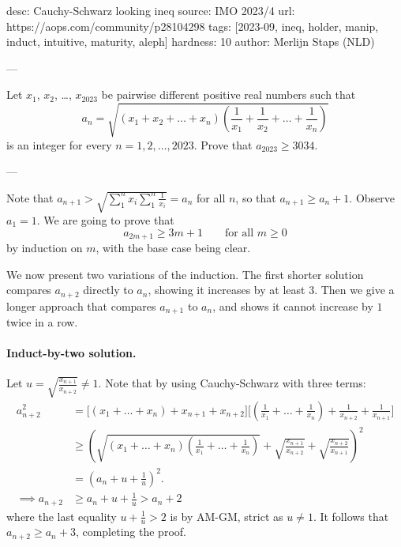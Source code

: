 desc: Cauchy-Schwarz looking ineq
source: IMO 2023/4
url: https://aops.com/community/p28104298
tags: [2023-09, ineq, holder, manip, induct, intuitive, maturity, aleph]
hardness: 10
author: Merlijn Staps (NLD)

---

Let $x_1$, $x_2$, \dots, $x_{2023}$ be pairwise different positive real numbers such that
\[ a_n = \sqrt{(x_1+x_2+\dots+x_n)
  \left(\frac{1}{x_1}+\frac{1}{x_2}+\dots+\frac{1}{x_n}\right)} \]
is an integer for every $n=1,2,\dots,2023$. Prove that $a_{2023} \geq 3034$.

---

Note that $a_{n+1} > \sqrt{\sum_1^n x_i \sum_1^n \frac{1}{x_i}} = a_n$ for all $n$,
so that $a_{n+1} \geq a_n + 1$.
Observe $a_1 = 1$.
We are going to prove that \[ a_{2m+1} \geq 3m+1 \qquad \text{for all } m \geq 0 \]
by induction on $m$, with the base case being clear.

We now present two variations of the induction.
The first shorter solution compares $a_{n+2}$ directly to $a_n$,
showing it increases by at least $3$.
Then we give a longer approach that compares $a_{n+1}$ to $a_n$,
and shows it cannot increase by $1$ twice in a row.

\paragraph{Induct-by-two solution.}
Let $u = \sqrt{\frac{x_{n+1}}{x_{n+2}}} \neq 1$.
Note that by using Cauchy-Schwarz with three terms:
\begin{align*}
  a_{n+2}^2 &= \Bigg[ (x_1+\dots+x_n)+x_{n+1}+x_{n+2} \Bigg]
    \Bigg[ \left(\frac{1}{x_1}+\dots+\frac{1}{x_n}\right)
    +\frac{1}{x_{n+2}} + \frac{1}{x_{n+1}} \Bigg] \\
  &\geq \left( \sqrt{ (x_1+\dots+x_n)\left(\frac{1}{x_1}+\dots+\frac{1}{x_n}\right)}
    + \sqrt{\frac{x_{n+1}}{x_{n+2}}} + \sqrt{\frac{x_{n+2}}{x_{n+1}}} \right)^2 \\
  &= \left( a_n + u + \frac 1u \right)^2. \\
  \implies a_{n+2} &\ge a_n + u + \frac 1u > a_n + 2
\end{align*}
where the last equality $u + \frac 1u > 2$ is by AM-GM, strict as $u \neq 1$.
It follows that $a_{n+2} \geq a_n + 3$, completing the proof.

